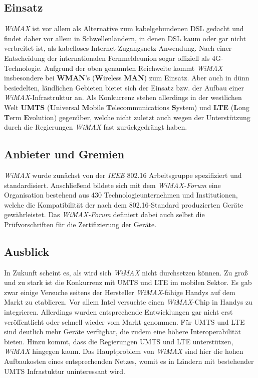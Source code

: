\begin{multicols}{3}

\subsection*{Einsatz}
\textit{WiMAX} ist vor allem als Alternative zum kabelgebundenen DSL gedacht und findet daher vor allem in Schwellenländern, in denen DSL kaum oder gar nicht verbreitet ist, als kabelloses Internet-Zugangsnetz Anwendung. Nach einer Entscheidung der internationalen Fernmeldeunion sogar offiziell als 4G-Technologie. Aufgrund der oben genannten Reichweite kommt \textit{WiMAX} insbesondere bei \textbf{WMAN}'s (\textbf{W}ireless \textbf{MAN}) zum Einsatz. Aber auch in dünn besiedelten, ländlichen Gebieten bietet sich der Einsatz bzw. der Aufbau einer \textit{WiMAX}-Infrastruktur an. Als Konkurrenz stehen allerdings in der westlichen Welt \textbf{UMTS} (\textbf{U}niversal \textbf{M}obile \textbf{T}elecommunications \textbf{S}ystem) und \textbf{LTE} (\textbf{L}ong \textbf{T}erm \textbf{E}volution) gegenüber, welche nicht zuletzt auch wegen der Unterstützung durch die Regierungen \textit{WiMAX} fast zurückgedrängt haben.  ~\cite{wmx.2}
\subsection*{Anbieter und Gremien}
\textit{WiMAX} wurde zunächst von der \textit{IEEE} 802.16 Arbeitsgruppe spezifiziert und standardisiert. Anschließend bildete sich mit dem \textit{WiMAX-Forum} eine Organisation bestehend aus 430 Technologieunternehmen und Institutionen, welche die Kompatibilität der nach dem 802.16-Standard produzierten Geräte gewährleistet. Das \textit{WiMAX-Forum} definiert dabei auch selbst die Prüfvorschriften für die Zertifizierung der Geräte.~\cite{wmx.9}

\subsection*{Ausblick}
In Zukunft scheint es, als wird sich \textit{WiMAX} nicht durchsetzen können. Zu groß und zu stark ist die Konkurrenz mit UMTS und LTE im mobilen Sektor. Es gab zwar einige Versuche seitens der Hersteller \textit{WiMAX}-fähige Handys auf dem Markt zu etablieren. Vor allem Intel versuchte einen \textit{WiMAX}-Chip in Handys zu integrieren. Allerdings wurden entsprechende Entwicklungen gar nicht erst veröffentlicht oder schnell wieder vom Markt genommen. Für UMTS und LTE sind deutlich mehr Geräte verfügbar, die zudem eine höhere Interoperabilität bieten. Hinzu kommt, dass die Regierungen UMTS und LTE unterstützen, \textit{WiMAX} hingegen kaum. Das Hauptproblem von \textit{WiMAX} sind hier die hohen Aufbaukosten eines entsprechenden Netzes, womit es in Ländern mit bestehender UMTS Infrastuktur uninteressant wird.


\end{multicols}

